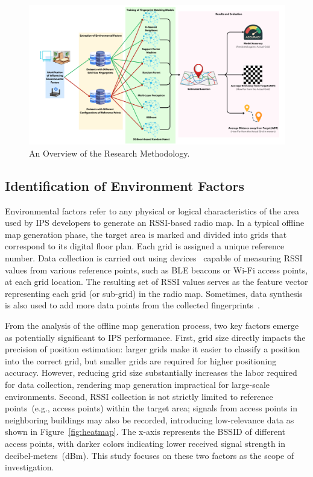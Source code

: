 \documentclass[runningheads]{llncs}
\begin{document}
\begin{figure}[th!]
        \centering
        \includegraphics[width=\linewidth]{figures/meth1.png}
        \caption{An Overview of the Research Methodology.}
        \label{fig:research-method}
\end{figure}

\subsection{Identification of Environment Factors}\label{ssec:identification-env-factors}

Environmental factors refer to any physical or logical characteristics of the area used by IPS developers to generate an RSSI-based radio map. In a typical offline map generation phase, the target area is marked and divided into grids that correspond to its digital floor plan. Each grid is assigned a unique reference number. Data collection is carried out using devices~\cite{add3,add4} capable of measuring RSSI values from various reference points, such as BLE beacons or Wi-Fi access points, at each grid location. The resulting set of RSSI values serves as the feature vector representing each grid (or sub-grid) in the radio map. Sometimes, data synthesis is also used to add more data points from the collected fingerprints~\cite{LRE6}.

From the analysis of the offline map generation process, two key factors emerge as potentially significant to IPS performance. First, grid size directly impacts the precision of position estimation: larger grids make it easier to classify a position into the correct grid, but smaller grids are required for higher positioning accuracy. However, reducing grid size substantially increases the labor required for data collection, rendering map generation impractical for large-scale environments. Second, RSSI collection is not strictly limited to reference points~(e.g., access points) within the target area; signals from access points in neighboring buildings may also be recorded, introducing low-relevance data as shown in Figure~\ref{fig:heatmap}. The x-axis represents the BSSID of different access points, with darker colors indicating lower received signal strength in decibel-meters~(dBm). This study focuses on these two factors as the scope of investigation.
\end{document}
